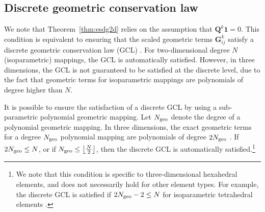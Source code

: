 \documentclass[review,onefignum,onetabnum,final]{siamart171218}
\begin{document}
\subsection{Discrete geometric conservation law}

We note that Theorem~\ref{thm:esdg2d} relies on the assumption that $\bm{Q}^k\bm{1} = 0$.  This condition is equivalent to ensuring that the scaled geometric terms ${\bm{G}}^k_{ij}$ satisfy a discrete geometric conservation law (GCL) \cite{carpenter2014entropy, gassner2017br1, crean2018entropy, chan2018discretely}.  For two-dimensional degree $N$ (isoparametric) mappings, the GCL is automatically satisfied.  However, in three dimensions, the GCL is not guaranteed to be satisfied at the discrete level, due to the fact that geometric terms for isoparametric mappings are polynomials of degree higher than $N$.  

It is possible to ensure the satisfaction of a discrete GCL by using a sub-parametric polynomial geometric mapping.  Let $N_{\rm geo}$ denote the degree of a polynomial geometric mapping.  In three dimensions, the exact geometric terms for a degree $N_{\rm geo}$ polynomial mapping are polynomials of degree $2N_{\rm geo}$ \cite{kopriva2006metric, hindenlang2012explicit, crean2018entropy}.  If $2N_{\rm geo} \leq N$, or if $N_{\rm geo} \leq \left\lfloor\frac{N}{2}\right\rfloor$, then the discrete GCL is automatically satisfied.\footnote{We note that this condition is specific to three-dimensional hexahedral elements, and does not necessarily hold for other element types.  For example, the discrete GCL is satisfied if $2N_{\rm geo}-2 \leq N$ for isoparametric tetrahedral elements \cite{chan2018discretely}.}
\end{document}
